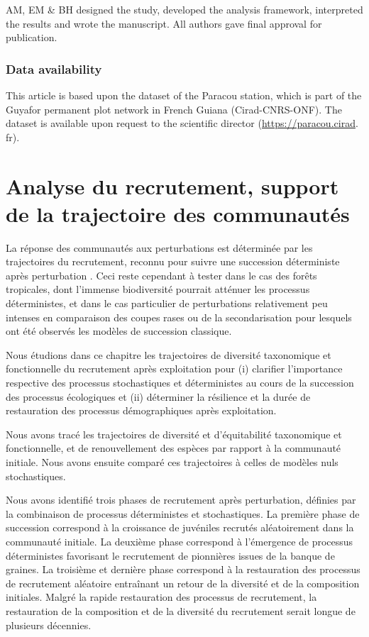 \documentclass[
  11pt,
  french,
  A4paper,
  extrafontsizes,onecolumn,openright
  ]{memoir}
\begin{document}
AM, EM \& BH designed the study, developed the analysis framework,
interpreted the results and wrote the manuscript. All authors gave final
approval for publication.

\subsection{Data availability}\label{data-availability}

This article is based upon the dataset of the Paracou station, which is
part of the Guyafor permanent plot network in French Guiana
(Cirad-CNRS-ONF). The dataset is available upon request to the
scientific director (\url{https://paracou.cirad}. fr).

\chapter{Analyse du recrutement, support de la trajectoire des
communautés}\label{analyse-du-recrutement-support-de-la-trajectoire-des-communautes}

La réponse des communautés aux perturbations est déterminée par les
trajectoires du recrutement, reconnu pour suivre une succession
déterministe après perturbation
\autocites[@][]{Clements1916}{Denslow2000}. Ceci reste cependant à
tester dans le cas des forêts tropicales, dont l'immense biodiversité
pourrait atténuer les processus déterministes, et dans le cas
particulier de perturbations relativement peu intenses en comparaison
des coupes rases ou de la secondarisation pour lesquels ont été observés
les modèles de succession classique.

Nous étudions dans ce chapitre les trajectoires de diversité taxonomique
et fonctionnelle du recrutement après exploitation pour (i) clarifier
l'importance respective des processus stochastiques et déterministes au
cours de la succession des processus écologiques et (ii) déterminer la
résilience et la durée de restauration des processus démographiques
après exploitation.

Nous avons tracé les trajectoires de diversité et d'équitabilité
taxonomique et fonctionnelle, et de renouvellement des espèces par
rapport à la communauté initiale. Nous avons ensuite comparé ces
trajectoires à celles de modèles nuls stochastiques.

Nous avons identifié trois phases de recrutement après perturbation,
définies par la combinaison de processus déterministes et stochastiques.
La première phase de succession correspond à la croissance de juvéniles
recrutés aléatoirement dans la communauté initiale. La deuxième phase
correspond à l'émergence de processus déterministes favorisant le
recrutement de pionnières issues de la banque de graines. La troisième
et dernière phase correspond à la restauration des processus de
recrutement aléatoire entraînant un retour de la diversité et de la
composition initiales. Malgré la rapide restauration des processus de
recrutement, la restauration de la composition et de la diversité du
recrutement serait longue de plusieurs décennies.
\end{document}
